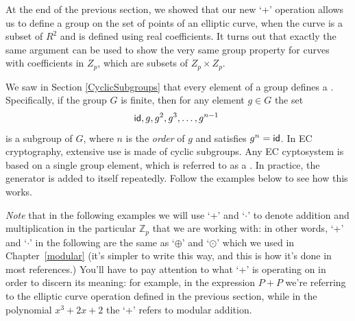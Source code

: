 At the end of the previous section, we showed that our new  `+' operation allows us to define a group on the set of points of an elliptic curve, when the curve is a subset of $R^2$ and is defined using real coefficients.  It turns out that exactly the same argument can be used to show the very same group property for curves with coefficients in $Z_p$, which are subsets of $Z_p \times Z_p$.  

We saw in Section \ref{CyclicSubgroups} that every element of a group defines a . Specifically, if the group $G$ is finite, then for any element $g \in G$ the set 
\[ {\sf{i}d}, g, g^2, g^3, \ldots, g^{n-1} \ \]
is a subgroup of $G$, where $n$ is the \emph{order} of $g$ and satisfies $g^n = {\sf{i}d}$. In EC cryptography, extensive use is made of cyclic subgroups.  Any EC cyptosystem is based on a single group element, which is referred to as a .  In practice, the generator is added to itself repeatedly. Follow the examples below to see how this works.

\emph{Note} that in the following examples we will use `+'  and `$\cdot$' to denote addition and multiplication in the particular  $\mathbb{Z}_p$ that we are working with: in other words, `+' and `$\cdot$' in the following are the same as `$\oplus$' and `$\odot$' which we used in Chapter~\ref{modular}  (it's simpler to write this way, and this is how it's done in most references.) You'll have to pay attention to what `+' is operating on in order to discern its meaning:  for example, in the expression $P+P$ we're referring to the elliptic curve operation defined in the previous section, while in the polynomial $x^3 + 2x + 2$  the `+' refers to modular addition. 

